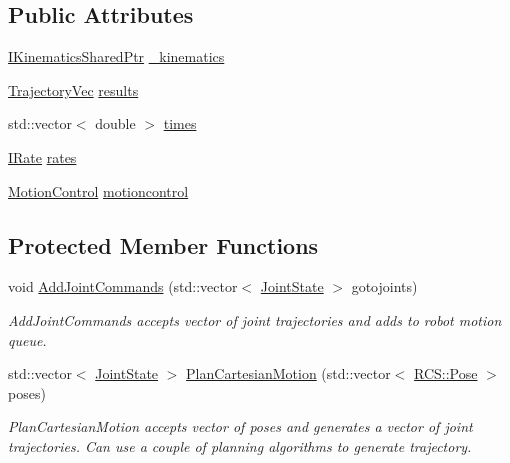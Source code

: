 \subsection*{Public Attributes}
\begin{DoxyCompactItemize}
\item 
\hyperlink{Kinematics_8h_aa720b9842c846588baf215581fb9f902}{I\-Kinematics\-Shared\-Ptr} \hyperlink{classRCSInterpreter_a0a78e67ba785253bf3de6877294da699}{\-\_\-kinematics}
\item 
\hyperlink{demo_8cpp_a2a09344c15175b0b6ea4da8bbffa8106}{Trajectory\-Vec} \hyperlink{classRCSInterpreter_a7b71ecaad68a14cc341d98d463e6f5b5}{results}
\item 
std\-::vector$<$ double $>$ \hyperlink{classRCSInterpreter_a2437a1768cfa972b39ff56c8f16ff3c1}{times}
\item 
\hyperlink{classRCS_1_1IRate}{I\-Rate} \hyperlink{classRCSInterpreter_a11b1a673682a9d0451877d3b5c3e0e3e}{rates}
\item 
\hyperlink{classMotionControl}{Motion\-Control} \hyperlink{classRCSInterpreter_ae59648ec8d61ea6957bbd320f2a4665a}{motioncontrol}
\end{DoxyCompactItemize}
\subsection*{Protected Member Functions}
\begin{DoxyCompactItemize}
\item 
void \hyperlink{classRCSInterpreter_af33d7a81522ff6de4f7e56a20520c4de}{Add\-Joint\-Commands} (std\-::vector$<$ \hyperlink{RCS_8h_aa4adb93a26caa4dacba9c9614e283245}{Joint\-State} $>$ gotojoints)
\begin{DoxyCompactList}\small\item\em Add\-Joint\-Commands accepts vector of joint trajectories and adds to robot motion queue. \end{DoxyCompactList}\item 
std\-::vector$<$ \hyperlink{RCS_8h_aa4adb93a26caa4dacba9c9614e283245}{Joint\-State} $>$ \hyperlink{classRCSInterpreter_a97141cf064f2db2959f0c7e9e911fd9c}{Plan\-Cartesian\-Motion} (std\-::vector$<$ \hyperlink{namespaceRCS_aa07e45d8a50e30064283d2b38087f999}{R\-C\-S\-::\-Pose} $>$ poses)
\begin{DoxyCompactList}\small\item\em Plan\-Cartesian\-Motion accepts vector of poses and generates a vector of joint trajectories. Can use a couple of planning algorithms to generate trajectory. \end{DoxyCompactList}\end{DoxyCompactItemize}


